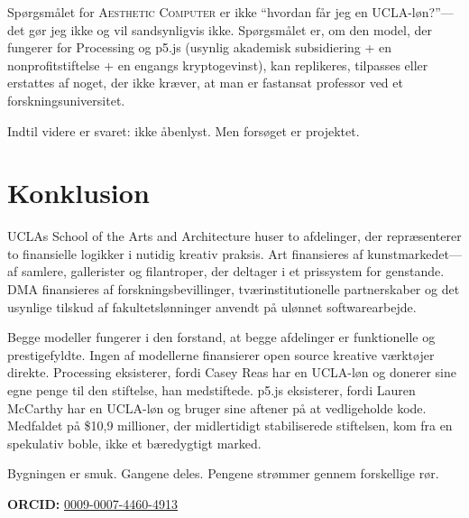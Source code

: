 \documentclass[10pt,letterpaper,twocolumn]{article}
\newcommand{\ac}{\textsc{Aesthetic Computer}}
\newcommand{\dma}{\textsc{DMA}}
\begin{document}
Spørgsmålet for \ac{} er ikke ``hvordan får jeg en UCLA-løn?''---det gør jeg ikke og vil sandsynligvis ikke. Spørgsmålet er, om den model, der fungerer for Processing og p5.js (usynlig akademisk subsidiering + en nonprofitstiftelse + en engangs kryptogevinst), kan replikeres, tilpasses eller erstattes af noget, der ikke kræver, at man er fastansat professor ved et forskningsuniversitet.

Indtil videre er svaret: ikke åbenlyst. Men forsøget er projektet.

\section{Konklusion}

UCLAs School of the Arts and Architecture huser to afdelinger, der repræsenterer to finansielle logikker i nutidig kreativ praksis. Art finansieres af kunstmarkedet---af samlere, gallerister og filantroper, der deltager i et prissystem for genstande. \dma{} finansieres af forskningsbevillinger, tværinstitutionelle partnerskaber og det usynlige tilskud af fakultetslønninger anvendt på ulønnet softwarearbejde.

Begge modeller fungerer i den forstand, at begge afdelinger er funktionelle og prestigefyldte. Ingen af modellerne finansierer open source kreative værktøjer direkte. Processing eksisterer, fordi Casey Reas har en UCLA-løn og donerer sine egne penge til den stiftelse, han medstiftede. p5.js eksisterer, fordi Lauren McCarthy har en UCLA-løn og bruger sine aftener på at vedligeholde kode. Medfaldet på \$10,9 millioner, der midlertidigt stabiliserede stiftelsen, kom fra en spekulativ boble, ikke et bæredygtigt marked.

Bygningen er smuk. Gangene deles. Pengene strømmer gennem forskellige rør.

\vspace{0.5em}
\noindent\textbf{ORCID:} \href{https://orcid.org/0009-0007-4460-4913}{0009-0007-4460-4913}



\end{document}
